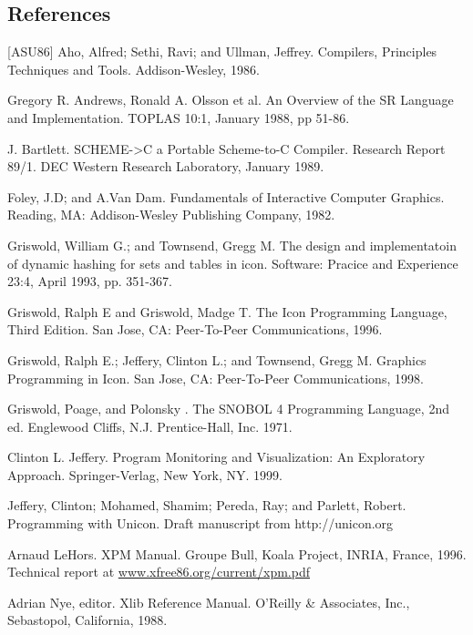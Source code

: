 \begin{noIndex}
\clearpage\section{References}

[ASU86] Aho, Alfred; Sethi, Ravi; and Ullman, Jeffrey. Compilers,
Principles Techniques and Tools. Addison-Wesley, 1986.

\noindent
[Andrews88] Gregory R. Andrews, Ronald A. Olsson et al. An Overview of the SR
Language and Implementation. TOPLAS 10:1, January 1988, pp 51-86.

\noindent
[Bartlett 89] J. Bartlett. SCHEME-{\textgreater}C a Portable
Scheme-to-C Compiler. Research Report 89/1. DEC Western Research
Laboratory, January 1989.

\noindent
[Foley82] Foley, J.D; and A.Van Dam. Fundamentals of Interactive
Computer Graphics. Reading, MA: Addison-Wesley Publishing Company,
1982.

\noindent
[Griswold93] Griswold, William G.; and Townsend, Gregg M.
The design and implementatoin of dynamic hashing for sets
and tables in icon. Software: Pracice and Experience 23:4,
April 1993, pp. 351-367.

\noindent
[Griswold96] Griswold, Ralph E and Griswold, Madge T. The Icon
Programming Language, Third Edition. San Jose, CA: Peer-To-Peer
Communications, 1996.

\noindent
[Griswold98] Griswold, Ralph E.; Jeffery, Clinton L.; and Townsend,
Gregg M. Graphics Programming in Icon. San Jose, CA: Peer-To-Peer
Communications, 1998.

\noindent
[Griswold71] Griswold, Poage, and Polonsky . The SNOBOL 4 Programming
Language, 2nd ed. Englewood Cliffs, N.J.  Prentice-Hall, Inc. 1971.

\noindent
[Jeffery99] Clinton L. Jeffery. Program Monitoring and Visualization:
An Exploratory Approach.  Springer-Verlag, New York, NY. 1999.

\noindent
[Jeffery04] Jeffery, Clinton; Mohamed, Shamim; Pereda, Ray; and
Parlett, Robert. Programming with Unicon. Draft manuscript from
http://unicon.org

\noindent
[LeHors96] Arnaud LeHors. XPM Manual. Groupe Bull, Koala
Project, INRIA, France, 1996. Technical report at
\url{www.xfree86.org/current/xpm.pdf}

\noindent
[Nye88] Adrian Nye, editor. Xlib Reference Manual. O'Reilly \&
Associates, Inc., Sebastopol, California, 1988.


\end{noIndex}
